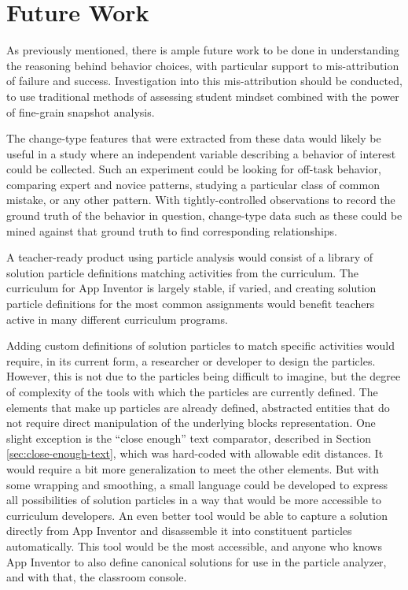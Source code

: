 

\section{Future Work}
\label{sec:futurework}

As previously mentioned, there is ample future work to be done in understanding the reasoning behind behavior choices, with particular support to mis-attribution of failure and success. Investigation into this mis-attribution should be conducted, to use traditional methods of assessing student mindset combined with the power of fine-grain snapshot analysis. 

The change-type features that were extracted from these data would likely be useful in a study where an independent variable describing a behavior of interest could be collected. Such an experiment could be looking for off-task behavior, comparing expert and novice patterns, studying a particular class of common mistake, or any other pattern. With tightly-controlled observations to record the ground truth of the behavior in question, change-type data such as these could be mined against that ground truth to find corresponding relationships. 

A teacher-ready product using particle analysis would consist of a library of solution particle definitions matching activities from the curriculum. The curriculum for App Inventor is largely stable, if varied, and creating solution particle definitions for the most common assignments would benefit teachers active in many different curriculum programs. 

Adding custom definitions of solution particles to match specific activities would require, in its current form, a researcher or developer to design the particles. However, this is not due to the particles being difficult to imagine, but the degree of complexity of the tools with which the particles are currently defined. The elements that make up particles are already defined, abstracted entities that do not require direct manipulation of the underlying blocks representation. One slight exception is the ``close enough'' text comparator, described in Section \ref{sec:close-enough-text}, which was hard-coded with allowable edit distances. It would require a bit more generalization to meet the other elements. But with some wrapping and smoothing, a small language could be developed to express all possibilities of solution particles in a way that would be more accessible to curriculum developers. An even better tool would be able to capture a solution directly from App Inventor and disassemble it into constituent particles automatically. This tool would be the most accessible, and anyone who knows App Inventor to also define canonical solutions for use in the particle analyzer, and with that, the classroom console. 

